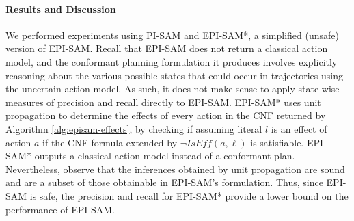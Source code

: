 \documentclass{article}
\theoremstyle{plain}
\theoremstyle{definition}
\theoremstyle{remark}
\theoremstyle{observation}
\newcommand{\iseff}{\textit{IsEff}}
\newcommand{\hai}[1]{{\textcolor{orange}{[Hai: #1]}}}
\newcommand{\roni}[1]{ }
\begin{document}

\paragraph{Results and Discussion}
We performed experiments using PI-SAM and EPI-SAM*, a simplified (unsafe) version of EPI-SAM. Recall that EPI-SAM does not return a classical action model, and the conformant planning formulation it produces involves explicitly reasoning about the various possible states that could occur in trajectories using the uncertain action model. As such, it does not make sense to apply state-wise measures of precision and recall directly to EPI-SAM.
EPI-SAM* uses unit propagation to determine the effects of every action in the CNF returned by Algorithm \ref{alg:episam-effects}, by checking if assuming literal $l$ is an effect of action $a$ if the CNF formula extended by $\neg\iseff(a,\ell)$ is satisfiable.\roni{This sentence is not clear.}
EPI-SAM* outputs a classical action model instead of a conformant plan. %
Nevertheless, observe that the inferences obtained by unit propagation are sound and are a subset of those obtainable in EPI-SAM's formulation. Thus, since EPI-SAM is safe, the precision and recall for EPI-SAM* provide a lower bound on the performance of EPI-SAM. %
\end{document}
